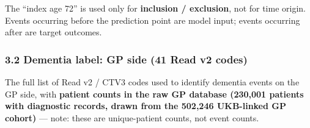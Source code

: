 \documentclass[
  11pt,
]{article}
\begin{document}
The ``index age 72'' is used only for \textbf{inclusion / exclusion},
not for time origin. Events occurring before the prediction point are
model input; events occurring after are target outcomes.

\subsubsection{3.2 Dementia label: GP side (41 Read v2
codes)}\label{dementia-label-gp-side-41-read-v2-codes}

The full list of Read v2 / CTV3 codes used to identify dementia events
on the GP side, with \textbf{patient counts in the raw GP database
(230,001 patients with diagnostic records, drawn from the 502,246
UKB-linked GP cohort)} --- note: these are unique-patient counts, not
event counts.
\end{document}
